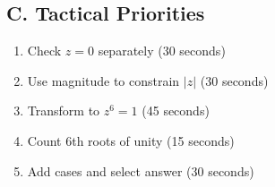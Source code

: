 \documentclass[11pt]{article}
\begin{document}
\begin{tacticalbox}
\subsection*{C. Tactical Priorities}
\begin{enumerate}[leftmargin=*]
    \item Check $z = 0$ separately (30 seconds)
    \item Use magnitude to constrain $|z|$ (30 seconds)
    \item Transform to $z^6 = 1$ (45 seconds)
    \item Count 6th roots of unity (15 seconds)
    \item Add cases and select answer (30 seconds)
\end{enumerate}
\end{tacticalbox}
\end{document}

